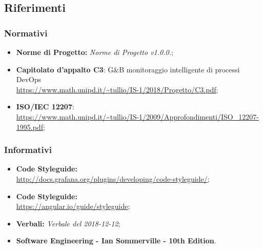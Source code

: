 \subsection{Riferimenti}

\subsubsection{Normativi}
\begin{itemize}
	\item \textbf{Norme di Progetto:} \emph{Norme di Progetto v1.0.0.};
	\item \textbf{Capitolato d'appalto C3}: G\&B monitoraggio intelligente di processi DevOps \\
	\url{https://www.math.unipd.it/~tullio/IS-1/2018/Progetto/C3.pdf};
	\item \textbf{ISO/IEC 12207}:\\ \url{https://www.math.unipd.it/~tullio/IS-1/2009/Approfondimenti/ISO_12207-1995.pdf};
\end{itemize}
\subsubsection{Informativi}
\begin{itemize}
	\item \textbf{ Code Styleguide:} \\
	\url{http://docs.grafana.org/plugins/developing/code-styleguide/};
	\item \textbf{ Code Styleguide:} \\
	\url{https://angular.io/guide/styleguide};
	\item \textbf{Verbali:} \emph{Verbale del 2018-12-12};
	\item \textbf{Software Engineering - Ian Sommerville - 10th Edition}.
\end{itemize}
\pagebreak